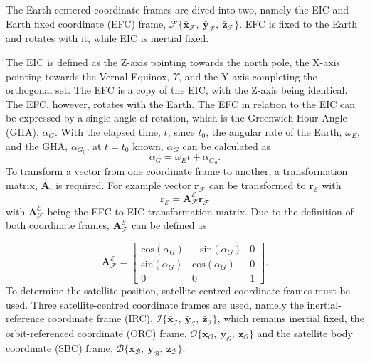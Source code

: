 The Earth-centered coordinate frames are dived into two, namely the EIC and Earth fixed coordinate (EFC) frame, $\mathcal{F}\{\bar{\mathbf{x}}_{\mathcal{F}},~\bar{\mathbf{y}}_{\mathcal{F}},~\bar{\mathbf{z}}_{\mathcal{F}}\}$. EFC is fixed to the Earth and rotates with it, while EIC is inertial fixed.


The EIC is defined as the Z-axis pointing towards the north pole, the X-axis pointing towards the Vernal Equinox, $\Upsilon$, and the Y-axis completing the orthogonal set. The EFC is a copy of the EIC, with the Z-axis being identical. The EFC, however, rotates with the Earth. The EFC in relation to the EIC can be expressed by a single angle of rotation, which is the Greenwich Hour Angle (GHA), $\alpha_G$. With the elapsed time, $t$, since $t_0$, the angular rate of the Earth, $\omega_E$, and the GHA, $\alpha_{G_0}$, at $t = t_0$ known, $\alpha_G$ can be calculated as 
\begin{equation}
\alpha_G = \omega_Et + \alpha_{G_0}.
\end{equation}
To transform a vector from one coordinate frame to another, a transformation matrix, $\boldsymbol{A}$, is required. For example vector $\mathbf{r}_{\mathcal{F}}$ can be transformed to $\mathbf{r}_{\mathcal{E}}$ with 
\begin{equation}
\mathbf{r}_{\mathcal{E}} = \boldsymbol{A}^{\mathcal{E}}_{\mathcal{F}}\mathbf{r}_{\mathcal{F}}
\end{equation}
with $\boldsymbol{A}^{\mathcal{E}}_{\mathcal{F}}$ being the EFC-to-EIC transformation matrix. Due to the definition of both coordinate frames, $\boldsymbol{A}^{\mathcal{E}}_{\mathcal{F}}$ can be defined as

\begin{equation}
\boldsymbol{A}^{\mathcal{E}}_{\mathcal{F}} = 
\begin{bmatrix}
	\text{cos}(\alpha_G) & -\text{sin}(\alpha_G) & 0\\
	\text{sin}(\alpha_G) & \text{cos}(\alpha_G) & 0 \\
	0 & 0 & 1
\end{bmatrix}.
\end{equation}
To determine the satellite position, satellite-centred coordinate frames must be used. Three satellite-centred coordinate frames are used, namely the inertial-reference coordinate frame (IRC), $\mathcal{I}\{\bar{\mathbf{x}}_{\mathcal{I}},~\bar{\mathbf{y}}_{\mathcal{I}},~\bar{\mathbf{z}}_{\mathcal{I}}\}$,  which remains inertial fixed, the orbit-referenced coordinate (ORC) frame, $\mathcal{O}\{\bar{\mathbf{x}}_{\mathcal{O}},~\bar{\mathbf{y}}_{\mathcal{O}},~\bar{\mathbf{z}}_{\mathcal{O}}\}$ and the satellite body coordinate (SBC) frame, $\mathcal{B}\{\bar{\mathbf{x}}_{\mathcal{B}},~\bar{\mathbf{y}}_{\mathcal{B}},~\bar{\mathbf{z}}_{\mathcal{B}}\}$. 

